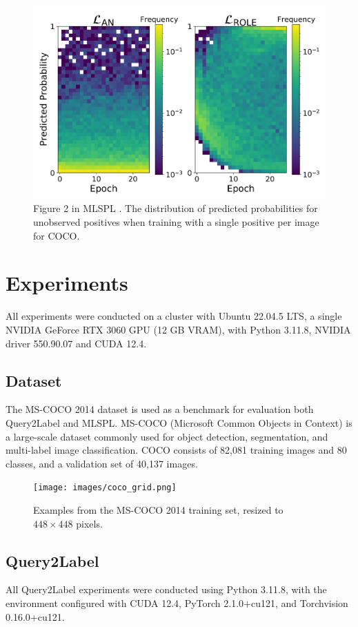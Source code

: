 \documentclass[lettersize,journal]{IEEEtran}
\begin{document}
\begin{figure}[h]
    \centering
    \includegraphics[width=.8\linewidth]{images/mlsp_fig2.png}
    \caption{Figure 2 in MLSPL \cite{mlsp}. The distribution of predicted probabilities for unobserved positives when training with a single positive per image for COCO.}
    \label{fig:mlsp_fig2}
\end{figure}



\section{Experiments}
All experiments were conducted on a cluster with Ubuntu 22.04.5 LTS, a single NVIDIA GeForce RTX 3060 GPU (12 GB VRAM), with Python 3.11.8, NVIDIA driver 550.90.07 and CUDA 12.4. 

\subsection{Dataset}
The MS-COCO 2014 \cite{coco14} dataset is used as a benchmark for evaluation both Query2Label and MLSPL. MS-COCO (Microsoft Common Objects in Context) is a large-scale dataset commonly used for object detection, segmentation, and multi-label image classification. COCO consists of 82,081 training images and 80 classes, and a validation set of 40,137 images.

\begin{figure}[t]
    \centering
    \texttt{[image: images/coco\_grid.png]}
    \caption{Examples from the MS-COCO 2014 training set, resized to $448 \times 448$ pixels.}
    \label{fig:coco-examples}
\end{figure}


\subsection{Query2Label}
All Query2Label experiments were conducted using Python 3.11.8, with the environment configured with CUDA 12.4, PyTorch 2.1.0+cu121, and Torchvision 0.16.0+cu121.
\end{document}
